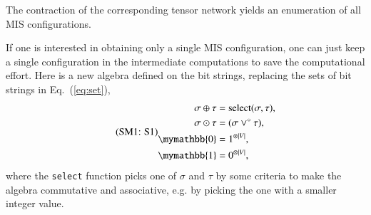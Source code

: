 \documentclass[onefignum, onetabnum]{siamart190516}
\newcommand{\eqname}[1]{\stepcounter{equation}\tag{\theequation : #1}}
\newcommand{\<}{\langle}
\renewcommand{\>}{\rangle}
\newcommand{\Eq}[1]{Eq.~(\ref{#1})}
\newcommand{\App}[1]{Appendix~\ref{#1}}
\begin{document}
The contraction of the corresponding tensor network yields an enumeration of all MIS configurations.

If one is interested in obtaining only a single MIS configuration, one can just keep a single configuration in the intermediate computations to save the computational effort.
Here is a new algebra defined on the bit strings, replacing the sets of bit strings in \Eq{eq:set}, 
%
\begin{equation}
\eqname{S1}
\begin{split}
    \sigma \oplus \tau &= {\rm select}(\sigma, \tau), \\
    \sigma \odot \tau &= (\sigma\lor^\circ \tau),\\
    \mymathbb{0} &= 1^{\otimes |V|}, \\
    \mymathbb{1} &= 0^{\otimes |V|},
\end{split}\label{eq:singleconfig}
\end{equation}
where the \texttt{select} function picks one of $\sigma$ and $\tau$ by some criteria to make the algebra commutative and associative, e.g. by picking the one with a smaller integer value.

\end{document}

